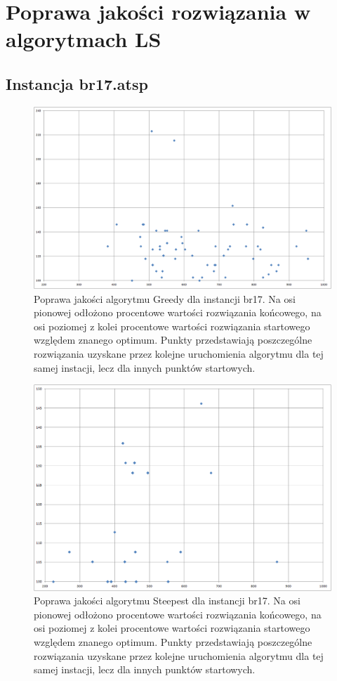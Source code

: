 \section{Poprawa jakości rozwiązania w algorytmach LS}
\subsection{Instancja br17.atsp}
\begin{figure}[!h]
\centering\includegraphics[width=12cm]{img/br17_b2e_g.png}
\caption{Poprawa jakości algorytmu Greedy dla instancji br17. Na osi pionowej odłożono procentowe wartości rozwiązania końcowego, na osi poziomej z kolei procentowe wartości rozwiązania startowego względem znanego optimum. Punkty przedstawiają poszczególne rozwiązania uzyskane przez kolejne uruchomienia algorytmu dla tej samej instacji, lecz dla innych punktów startowych.}\label{rys:br17g}
\end{figure}
\begin{figure}[!h]
\centering\includegraphics[width=12cm]{img/br17_b2e_s.png}
\caption{Poprawa jakości algorytmu Steepest dla instancji br17. Na osi pionowej odłożono procentowe wartości rozwiązania końcowego, na osi poziomej z kolei procentowe wartości rozwiązania startowego względem znanego optimum. Punkty przedstawiają poszczególne rozwiązania uzyskane przez kolejne uruchomienia algorytmu dla tej samej instacji, lecz dla innych punktów startowych.}\label{rys:br17s}
\end{figure}


